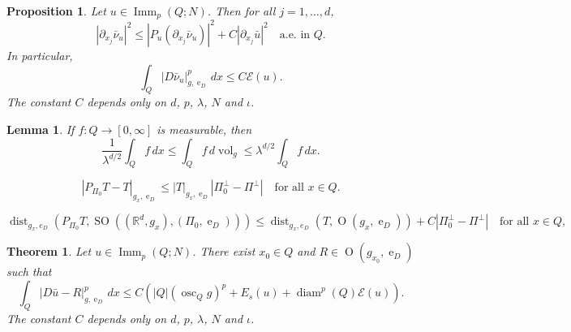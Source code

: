\documentclass[10pt,a4paper]{amsart}
\newtheorem{theorem}{Theorem}
\newtheorem{proposition}{Proposition}
\newtheorem{lemma}{Lemma}
\DeclareMathOperator{\Imm}{Imm}
\DeclareMathOperator{\Ort}{O}
\DeclareMathOperator{\SO}{SO}
\DeclareMathOperator{\diam}{diam}
\DeclareMathOperator{\dist}{dist}
\DeclareMathOperator{\e}{e}
\DeclareMathOperator*{\osc}{osc}
\DeclareMathOperator{\vol}{vol}
\begin{document}
\begin{proposition} \label{pr:derivative_normal_estimate}
    Let $u \in \Imm_p(Q; N)$. Then for all $j = 1, \dots, d$,
    \begin{equation} \label{eq:derivative_of_the_normal_bound1}
        |\partial_{x_j} \bar{\nu}_u|^2 \le |P_u(\partial_{x_j} \bar{\nu}_u)|^2 + C |\partial_{x_j} \bar{u}|^2 \quad \text{a.e. in } Q.
    \end{equation}
    In particular,
    \[
    \int_Q |D\bar{\nu}_u|_{g, \e_D}^p \, dx \le C \mathcal{E}(u).
    \]
    The constant $C$ depends only on $d$, $p$, $\lambda$, $N$ and $\iota$.
\end{proposition}

\begin{lemma} \label{lm:change_in_volume}
    If $f : Q \rightarrow [0, \infty]$ is measurable, then
    \[
    \frac{1}{\lambda^{d/2}} \int_Q f \, dx \le \int_Q f \, d\vol_g \le \lambda^{d/2} \int_Q f \, dx.
    \]
\end{lemma}

    \begin{equation} \label{eq:error_in_projection}
        |P_{\Pi_0}T - T|_{g_x, \e_D} \le |T|_{g_x, \e_D}|\Pi_0^\perp - \Pi^\perp| \quad \text{for all } x \in Q.
    \end{equation}

    \begin{equation} \label{eq:bound_for_distance_from_oriented_rotations}
        \dist_{g_x, e_D}\left(P_{\Pi_0} T, \SO\left((\mathbb{R}^d, g_x), (\Pi_0, \e_D)\right)\right) \le \dist_{g_x, e_D}(T, \Ort(g_x, \e_D)) + C|\Pi_0^\perp - \Pi^\perp| \quad \text{for all } x \in Q,
    \end{equation}

\begin{theorem} \label{thm:codimension1_compact_rigidity}
    Let $u \in \Imm_p(Q; N)$. There exist $x_0 \in Q$ and $R \in \Ort(g_{x_0}, \e_D)$ such that
    \[
    \int_Q |D\bar{u} - R|_{g, \e_D}^p \, dx \le C \left(|Q| \left(\osc_Q g\right)^p + E_s(u) + \diam^p(Q) \mathcal{E}(u)\right).
    \]
    The constant $C$ depends only on $d$, $p$, $\lambda$, $N$ and $\iota$.
\end{theorem}
\end{document}
